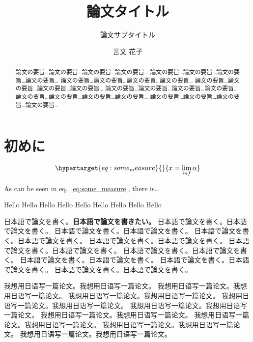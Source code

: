 \documentclass[
  12pt,
  titlepage,
  draft]{ltjsarticle}
\title{論文タイトル}
\subtitle{論文サブタイトル}
\author{言文 花子}
\date{}
\begin{document}
\maketitle
\begin{abstract}
論文の要旨\ldots 論文の要旨\ldots 論文の要旨\ldots 論文の要旨\ldots{}
論文の要旨\ldots 論文の要旨\ldots 論文の要旨\ldots 論文の要旨\ldots{}
論文の要旨\ldots 論文の要旨\ldots 論文の要旨\ldots 論文の要旨\ldots{}
論文の要旨\ldots 論文の要旨\ldots 論文の要旨\ldots 論文の要旨\ldots{}
論文の要旨\ldots 論文の要旨\ldots 論文の要旨\ldots 論文の要旨\ldots{}
論文の要旨\ldots 論文の要旨\ldots 論文の要旨\ldots 論文の要旨\ldots{}
論文の要旨\ldots 論文の要旨\ldots 論文の要旨\ldots 論文の要旨\ldots{}
\end{abstract}

{
\setcounter{tocdepth}{3}
\tableofcontents
}
\listoffigures
\listoftables
\newpage

\hypertarget{ux521dux3081ux306b}{%
\section{初めに}\label{ux521dux3081ux306b}}

\lipsum[1-2]

\begin{equation}\protect\hypertarget{eq:some_measure}{}{x = \lim_{inf}\alpha}\label{eq:some_measure}\end{equation}

As can be seen in eq.~\ref{eq:some_measure}, there is\ldots{}

Hello Hello Hello Hello Hello Hello Hello Hello Hello

日本語で論文を書く。\textbf{日本語で論文を書きたい。}
日本語で論文を書く。日本語で論文を書く。
日本語で論文を書く。日本語で論文を書く。
日本語で論文を書く。日本語で論文を書く。
日本語で論文を書く。日本語で論文を書く。
日本語で論文を書く。日本語で論文を書く。
日本語で論文を書く。日本語で論文を書く。
日本語で論文を書く。日本語で論文を書く。
日本語で論文を書く。日本語で論文を書く。
日本語で論文を書く。日本語で論文を書く。

我想用日语写一篇论文。我想用日语写一篇论文。
我想用日语写一篇论文。我想用日语写一篇论文。
我想用日语写一篇论文。我想用日语写一篇论文。
我想用日语写一篇论文。我想用日语写一篇论文。
我想用日语写一篇论文。我想用日语写一篇论文。
我想用日语写一篇论文。我想用日语写一篇论文。
我想用日语写一篇论文。我想用日语写一篇论文。
我想用日语写一篇论文。我想用日语写一篇论文。
我想用日语写一篇论文。我想用日语写一篇论文。
\end{document}
